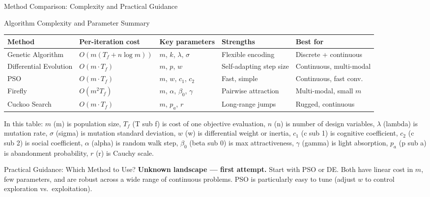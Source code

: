 \documentclass[aspectratio=169,10pt]{beamer}
\begin{document}
\begin{frame}[allowframebreaks]{Method Comparison: Complexity and Practical Guidance}

  \begin{block}{Algorithm Complexity and Parameter Summary}
    \footnotesize
    \begin{tabular}{lllll}
      \toprule
      Method & Per-iteration cost & Key parameters & Strengths & Best for \\
      \midrule
      Genetic Algorithm
        & $O(m(T_f + n\log m))$
        & $m$, $k$, $\lambda$, $\sigma$
        & Flexible encoding
        & Discrete + continuous \\
      Differential Evolution
        & $O(m \cdot T_f)$
        & $m$, $p$, $w$
        & Self-adapting step size
        & Continuous, multi-modal \\
      PSO
        & $O(m \cdot T_f)$
        & $m$, $w$, $c_1$, $c_2$
        & Fast, simple
        & Continuous, fast conv. \\
      Firefly
        & $O(m^2 T_f)$
        & $m$, $\alpha$, $\beta_0$, $\gamma$
        & Pairwise attraction
        & Multi-modal, small $m$ \\
      Cuckoo Search
        & $O(m \cdot T_f)$
        & $m$, $p_a$, $r$
        & Long-range jumps
        & Rugged, continuous \\
      \bottomrule
    \end{tabular}
    \vspace{4pt}
    In this table: $m$ (m) is population size, $T_f$ (T sub f) is
    cost of one objective evaluation, $n$ (n) is number of design
    variables, $\lambda$ (lambda) is mutation rate, $\sigma$ (sigma)
    is mutation standard deviation, $w$ (w) is differential weight
    or inertia, $c_1$ (c sub 1) is cognitive coefficient,
    $c_2$ (c sub 2) is social coefficient, $\alpha$ (alpha) is
    random walk step, $\beta_0$ (beta sub 0) is max attractiveness,
    $\gamma$ (gamma) is light absorption, $p_a$ (p sub a) is
    abandonment probability, $r$ (r) is Cauchy scale.
  \end{block}

  \framebreak

  \begin{block}{Practical Guidance: Which Method to Use?}
    \textbf{Unknown landscape --- first attempt.}
    Start with PSO or DE.  Both have linear cost in $m$, few
    parameters, and are robust across a wide range of continuous
    problems.  PSO is particularly easy to tune (adjust $w$ to
    control exploration vs.\ exploitation).


\end{block}
\end{frame}
\end{document}
